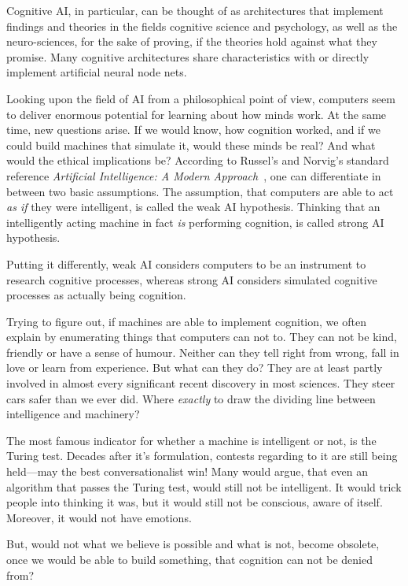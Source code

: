 Cognitive AI, in particular, can be thought of as architectures that implement findings and theories in the fields cognitive science and psychology, as well as the neuro-sciences, for the sake of proving, if the theories hold against what they promise. Many cognitive architectures share characteristics with or directly implement artificial neural node nets.

Looking upon the field of AI from a philosophical point of view, computers seem to deliver enormous potential for learning about how minds work. At the same time, new questions arise. If we would know, how cognition worked, and if we could build machines that simulate it, would these minds be real? And what would the ethical implications be? According to Russel's and Norvig's standard reference \emph{Artificial Intelligence: A Modern Approach}~\cite{russell2009artificial}, one can differentiate in between two basic assumptions. The assumption, that computers are able to act \emph{as if} they were intelligent, is called the weak AI hypothesis. Thinking that an intelligently acting machine in fact \emph{is} performing cognition, is called strong AI hypothesis.

Putting it differently, weak AI considers computers to be an instrument to research cognitive processes, whereas strong AI considers simulated cognitive processes as actually being cognition.

Trying to figure out, if machines are able to implement cognition, we often explain by enumerating things that computers can not to. They can not be kind, friendly or have a sense of humour. Neither can they tell right from wrong, fall in love or learn from experience. But what can they do? They are at least partly involved in almost every significant recent discovery in most sciences. They steer cars safer than we ever did. Where \emph{exactly} to draw the dividing line between intelligence and machinery?~\cite{russell2009artificial}

The most famous indicator for whether a machine is intelligent or not, is the Turing test. Decades after it's formulation, contests regarding to it are still being held---may the best conversationalist win! Many would argue, that even an algorithm that passes the Turing test, would still not be intelligent. It would trick people into thinking it was, but it would still not be conscious, aware of itself. Moreover, it would not have emotions.~\cite{russell2009artificial}

But, would not what we believe is possible and what is not, become obsolete, once we would be able to build something, that cognition can not be denied from? 

